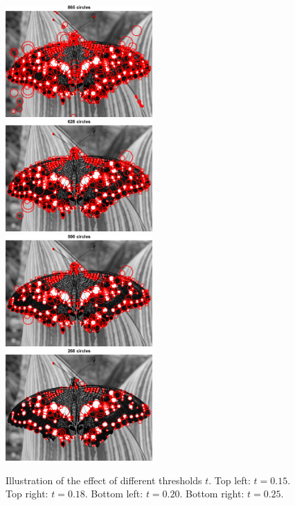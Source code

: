 \documentclass[a4paper,psfig,subfigure,epsfig,fleqn,ausarbeitung,amssmb,float,caption,fontenc]{article}
\begin{document}
\begin{figure}[h]
	\includegraphics[width=0.5\textwidth]{figures/a3_butterfly_k015.png}
	\includegraphics[width=0.5\textwidth]{figures/a3_butterfly_k018.png}
	\includegraphics[width=0.5\textwidth]{figures/a3_butterfly_k020.png}
	\includegraphics[width=0.5\textwidth]{figures/a3_butterfly_k025.png}
	\caption{Illustration of the effect of different thresholds $t$. Top left: $t=0.15$. Top right: $t=0.18$. Bottom left: $t=0.20$. Bottom right: $t=0.25$.}
	\label{fig:a3:thresholds}
\end{figure}
\end{document}
